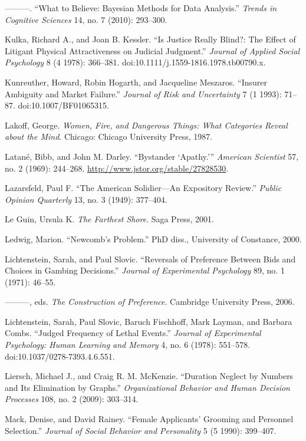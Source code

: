 \documentclass[letterpaper]{book}
\begin{document}
{
 {}---{}---{}---. ``What to Believe: Bayesian
Methods for Data Analysis.'' \textit{Trends in
Cognitive Sciences} 14, no. 7 (2010): 293--300.}

{
 Kulka, Richard A., and Joan B. Kessler. ``Is
Justice Really Blind?: The Effect of Litigant Physical Attractiveness
on Judicial Judgment.'' \textit{Journal of Applied
Social Psychology} 8 (4 1978): 366--381.
doi:10.1111/j.1559-1816.1978.tb00790.x.}

{
 Kunreuther, Howard, Robin Hogarth, and Jacqueline Meszaros.
``Insurer Ambiguity and Market
Failure.'' \textit{Journal of Risk and Uncertainty} 7
(1 1993): 71--87. doi:10.1007/BF01065315.}

{
 Lakoff, George. \textit{Women, Fire, and Dangerous Things: What
Categories Reveal about the Mind}. Chicago: Chicago University Press,
1987.}

{
 Latané, Bibb, and John M. Darley. ``Bystander
`Apathy.'''
\textit{American Scientist} 57, no. 2 (1969): 244--268.
\url{http://www.jstor.org/stable/27828530}.}

{
 Lazarsfeld, Paul F. ``The American Solidier---An
Expository Review.'' \textit{Public Opinion
Quarterly} 13, no. 3 (1949): 377--404.}

{
 Le Guin, Ursula K. \textit{The Farthest Shore}. Saga Press, 2001.}

{
 Ledwig, Marion. ``Newcomb's
Problem.'' PhD diss., University of Constance, 2000.}

{
 Lichtenstein, Sarah, and Paul Slovic. ``Reversals
of Preference Between Bids and Choices in Gambing
Decisions.'' \textit{Journal of Experimental
Psychology} 89, no. 1 (1971): 46--55.}

{
 {}---{}---{}---, eds. \textit{The Construction of Preference}.
Cambridge University Press, 2006.}

{
 Lichtenstein, Sarah, Paul Slovic, Baruch Fischhoff, Mark Layman,
and Barbara Combs. ``Judged Frequency of Lethal
Events.'' \textit{Journal of Experimental Psychology:
Human Learning and Memory} 4, no. 6 (1978): 551--578.
doi:10.1037/0278-7393.4.6.551.}

{
 Liersch, Michael J., and Craig R. M. McKenzie.
``Duration Neglect by Numbers and Its Elimination by
Graphs.'' \textit{Organizational Behavior and Human
Decision Processes} 108, no. 2 (2009): 303--314.}

{
 Mack, Denise, and David Rainey. ``Female
Applicants' Grooming and Personnel
Selection.'' \textit{Journal of Social Behavior and
Personality} 5 (5 1990): 399--407.}
\end{document}
